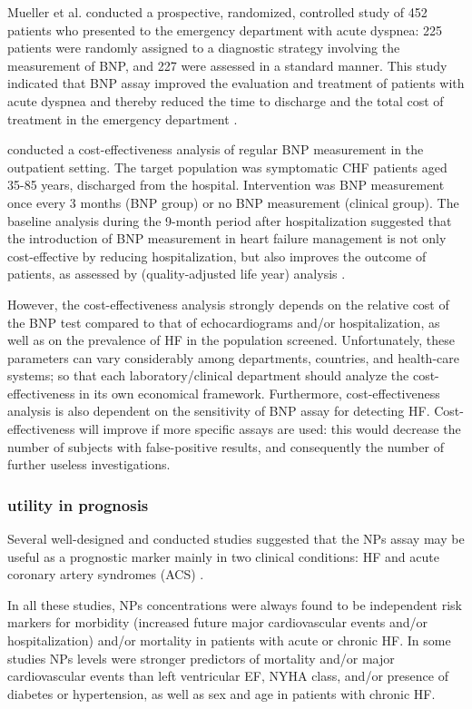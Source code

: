 \documentclass[14pt,a4paper,onecolumn]{extarticle}
\begin{document}
Mueller et al. conducted a prospective, randomized, controlled study of 452 patients who presented to the emergency department with acute dyspnea: 225 patients were randomly assigned to a diagnostic strategy involving the measurement of BNP, and 227 were assessed in a standard manner. This study indicated that BNP assay improved the evaluation and treatment of patients with acute dyspnea and thereby reduced the time to discharge and the total cost of treatment in the emergency department \citep{Mueller2004}.

\citep{bib3263} conducted a cost-effectiveness analysis of regular BNP measurement in the outpatient setting. The target population was symptomatic CHF patients aged 35-85 years,  discharged from the hospital. Intervention was BNP measurement once every 3 months (BNP group) or no BNP measurement (clinical group). The baseline analysis during the 9-month period after hospitalization suggested that the introduction of BNP measurement in heart failure management is not only cost-effective by reducing hospitalization, but also improves the outcome of patients, as assessed by (quality-adjusted life year) analysis \citep{bib3263}.

However, the cost-effectiveness analysis strongly depends on the relative cost of the BNP test compared to that of echocardiograms and/or hospitalization, as well as on the prevalence of HF in the population screened. Unfortunately, these parameters can vary considerably among departments, countries, and health-care systems; so that each laboratory/clinical department should analyze the cost-effectiveness in its own economical framework. Furthermore, cost-effectiveness analysis is also dependent on the sensitivity of BNP assay for detecting HF. Cost-effectiveness will improve if more specific assays are used: this would decrease the number of subjects with false-positive results, and consequently the number of further useless investigations. \citep{bib3263}

\subsubsection{utility in prognosis}

Several well-designed and conducted studies suggested that the NPs assay may be useful as a prognostic marker mainly in two clinical conditions: HF and acute coronary artery syndromes (ACS) \citep{bib35}.

In all these studies, NPs concentrations were always found to be independent risk markers for morbidity (increased future major cardiovascular events and/or hospitalization) and/or mortality in patients with acute or chronic HF. In some studies NPs levels were stronger predictors of mortality and/or major cardiovascular events than left ventricular EF, NYHA class, and/or presence of diabetes or hypertension, as well as sex and age in patients with chronic HF. \citep{bib35}
\end{document}
